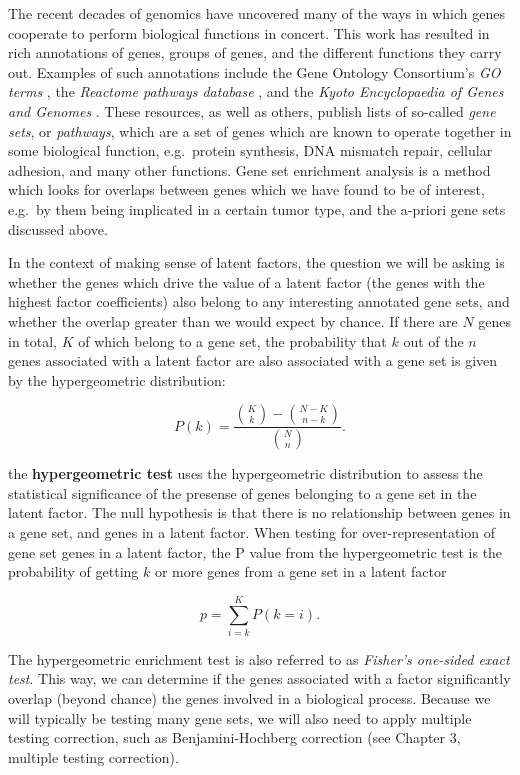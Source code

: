 \documentclass[12pt,]{krantz}
\begin{document}
The recent decades of genomics have uncovered many of the ways in which genes cooperate to perform biological functions in concert. This work has resulted in rich annotations of genes, groups of genes, and the different functions they carry out. Examples of such annotations include the Gene Ontology Consortium's \emph{GO terms} \citep[\citet{go_latest_paper}]{go_first_paper}, the \emph{Reactome pathways database} \citep{reactome_latent_paper}, and the \emph{Kyoto Encyclopaedia of Genes and Genomes} \citep{kegg_latest_paper}. These resources, as well as others, publish lists of so-called \emph{gene sets}, or \emph{pathways}, which are a set of genes which are known to operate together in some biological function, e.g.~protein synthesis, DNA mismatch repair, cellular adhesion, and many other functions. Gene set enrichment analysis is a method which looks for overlaps between genes which we have found to be of interest, e.g.~by them being implicated in a certain tumor type, and the a-priori gene sets discussed above.

In the context of making sense of latent factors, the question we will be asking is whether the genes which drive the value of a latent factor (the genes with the highest factor coefficients) also belong to any interesting annotated gene sets, and whether the overlap greater than we would expect by chance. If there are \(N\) genes in total, \(K\) of which belong to a gene set, the probability that \(k\) out of the \(n\) genes associated with a latent factor are also associated with a gene set is given by the hypergeometric distribution:

\[
P(k) = \frac{{\binom{K}{k}} - \binom{N-K}{n-k}}{\binom{N}{n}}.
\]

the \textbf{hypergeometric test} uses the hypergeometric distribution to assess the statistical significance of the presense of genes belonging to a gene set in the latent factor. The null hypothesis is that there is no relationship between genes in a gene set, and genes in a latent factor. When testing for over-representation of gene set genes in a latent factor, the P value from the hypergeometric test is the probability of getting \(k\) or more genes from a gene set in a latent factor

\[
p = \sum_{i=k}^K P(k=i).
\]

The hypergeometric enrichment test is also referred to as \emph{Fisher's one-sided exact test}. This way, we can determine if the genes associated with a factor significantly overlap (beyond chance) the genes involved in a biological process. Because we will typically be testing many gene sets, we will also need to apply multiple testing correction, such as Benjamini-Hochberg correction (see Chapter 3, multiple testing correction).
\end{document}
